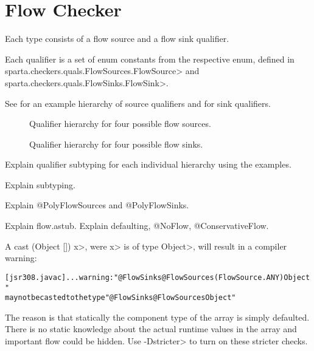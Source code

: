 \htmlhr
\chapter{Flow Checker\label{flow-checker}}

Each type consists of a flow source and a flow sink qualifier.

Each qualifier is a set of enum constants from the respective enum,
defined in \<sparta.checkers.quals.FlowSources.FlowSource> and
\<sparta.checkers.quals.FlowSinks.FlowSink>.


See  for an example hierarchy of
source qualifiers and  for sink
qualifiers.


\begin{figure}
\caption{Qualifier hierarchy for four possible flow sources.}
\label{fig:flowsources-hierarchy}
\end{figure}

\begin{figure}
\caption{Qualifier hierarchy for four possible flow sinks.}
\label{fig:flowsinks-hierarchy}
\end{figure}


Explain qualifier subtyping for each individual hierarchy using the examples.

Explain subtyping.

Explain @PolyFlowSources and @PolyFlowSinks.

Explain flow.astub.
Explain defaulting, @NoFlow, @ConservativeFlow.

A cast \<(Object []) x>, were \<x> is of type \<Object>, will result
in a compiler warning:

\begin{alltt}
[jsr308.javac] ... warning: "@FlowSinks @FlowSources({FlowSource.ANY}) Object"
       may not be casted to the type "@FlowSinks @FlowSources Object"
\end{alltt}

The reason is that statically the component type of the array is
simply defaulted. There is no static knowledge about the actual
runtime values in the array and important flow could be hidden.
Use \<-Dstricter> to turn on these stricter checks.
